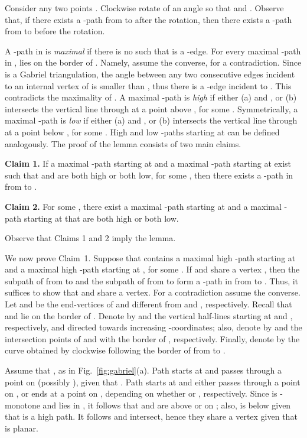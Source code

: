 \documentclass{llncs}
\renewenvironment{proof}
{{\bf Proof:}}{\hspace*{\fill}\par\vspace{2mm}}
\begin{document}
\begin{proof}
Consider any two points . Clockwise rotate  of an angle  so that  and . Observe that, if there exists a -path from  to  after the rotation, then there exists a -path from  to  before the rotation.

A -path  in  is {\em maximal} if there is no  such that  is a -edge. For every maximal -path  in ,  lies on the border of . Namely, assume the converse, for a contradiction. Since  is a Gabriel triangulation, the angle between any two consecutive edges incident to an internal vertex of  is smaller than , thus there is a -edge incident to .  This contradicts the maximality of .  A maximal -path  is {\em high} if either (a)  and , or (b)  intersects the vertical line through  at a point above , for some . Symmetrically, a maximal -path  is {\em low} if either (a)  and , or (b)  intersects the vertical line through  at a point below , for some . High and low -paths starting at  can be defined analogously. The proof of the lemma consists of two main claims.

{\bf Claim 1.} If a maximal -path  starting at  and a maximal -path  starting at  exist such that  and  are both high or both low, for some , then there exists a -path in  from  to .

{\bf Claim 2.} For some , there exist a maximal -path  starting at  and a maximal -path  starting at  that are both high or both low.

Observe that Claims 1 and 2 imply the lemma.

We now prove Claim~1. Suppose that  contains a maximal high -path  starting at  and a maximal high -path  starting at , for some . If  and  share a vertex , then the subpath of  from  to  and the subpath of  from  to  form a -path in  from  to . Thus, it suffices to show that  and  share a vertex. For a contradiction assume the converse. Let  and  be the end-vertices of  and  different from  and , respectively. Recall that  and  lie on the border of . Denote by  and  the vertical half-lines starting at  and , respectively, and directed towards increasing -coordinates; also, denote by  and  the intersection points of  and  with the border of , respectively. Finally, denote by  the curve obtained by clockwise following the border of  from  to .

Assume that , as in Fig.~\ref{fig:gabriel}(a). Path  starts at  and passes through a point  on  (possibly ), given that  . Path  starts at  and either passes through a point  on , or ends at a point  on , depending on whether  or , respectively. Since  is -monotone and lies in , it follows that  and  are above or on ; also,  is below  given that  is a high path. It follows  and  intersect, hence they share a vertex given that  is planar.


\end{proof}
\end{document}
